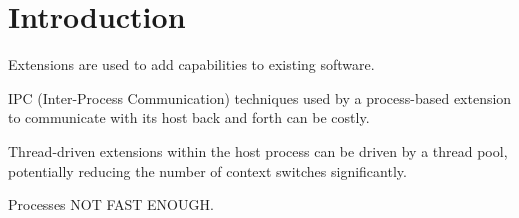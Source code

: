 \chapter{Introduction}

Extensions are used to add capabilities to existing software.

IPC (Inter-Process Communication) techniques used by a process-based extension
to communicate with its host back and forth can be costly.

Thread-driven extensions within the host process can be driven by a thread
pool, potentially reducing the number of context switches significantly.

Processes NOT FAST ENOUGH.
